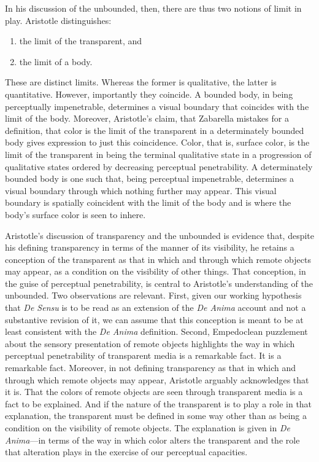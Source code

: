 In his discussion of the unbounded, then, there are thus two notions of limit in play. Aristotle distinguishes:
\begin{enumerate}[(1)]
	\item the limit of the transparent, and
	\item the limit of a body.
\end{enumerate}
These are distinct limits. Whereas the former is qualitative, the latter is quantitative. However, importantly they coincide. A bounded body, in being perceptually impenetrable, determines a visual boundary that coincides with the limit of the body. Moreover, Aristotle's claim, that Zabarella mistakes for a definition, that color is the limit of the transparent in a determinately bounded body gives expression to just this coincidence. Color, that is, surface color, is the limit of the transparent in being the terminal qualitative state in a progression of qualitative states ordered by decreasing perceptual penetrability. A determinately bounded body is one such that, being perceptual impenetrable, determines a visual boundary through which nothing further may appear. This visual boundary is spatially coincident with the limit of the body and is where the body's surface color is seen to inhere.

Aristotle's discussion of transparency and the unbounded is evidence that, despite his defining transparency in terms of the manner of its visibility, he retains a conception of the transparent as that in which and through which remote objects may appear, as a condition on the visibility of other things. That conception, in the guise of perceptual penetrability, is central to Aristotle's understanding of the unbounded. Two observations are relevant. First, given our working hypothesis that \emph{De Sensu} is to be read as an extension of the \emph{De Anima} account and not a substantive revision of it, we can assume that this conception is meant to be at least consistent with the \emph{De Anima} definition.  Second, Empedoclean puzzlement about the sensory presentation of remote objects highlights the way in which perceptual penetrability of transparent media is a remarkable fact. It is a remarkable fact. Moreover, in not defining transparency as that in which and through which remote objects may appear, Aristotle arguably acknowledges that it is. That the colors of remote objects are seen through transparent media is a fact to be explained. And if the nature of the transparent is to play a role in that explanation, the transparent must be defined in some way other than as being a condition on the visibility of remote objects. The explanation is given in \emph{De Anima}---in terms of the way in which color alters the transparent and the role that alteration plays in the exercise of our perceptual capacities.


